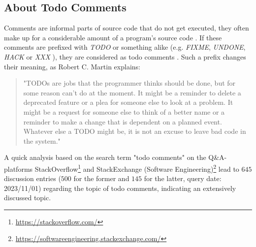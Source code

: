\subsection{About Todo Comments}
\label{sec:introduction-about-todo-comments}
Comments are informal parts of source code that do not get executed, they often make up for a considerable amount of a program's source code \cite{nie_natural_2018}.
If these comments are prefixed with \emph{TODO} or something alike (e.g. \emph{FIXME}, \emph{UNDONE}, \emph{HACK} or \emph{XXX} \cite{storey_how_2009}), they are considered as todo comments \cite{ying_source_2005}.
Such a prefix changes their meaning, as Robert C. Martin explains:
%
\begin{quote}
    "TODOs are jobs that the programmer thinks should be done, but for some reason can't do at the moment. It might be a reminder to delete a deprecated feature or a plea for someone else to look at a problem. It might be a request for someone else to think of a better name or a reminder to make a change that is dependent on a planned event. Whatever else a TODO might be, it is not an excuse to leave bad code in the system." \cite{martin_clean_2009}
\end{quote}
%
A quick analysis based on the search term "todo comments" on the Q\&A-platforms StackOverflow\footnote{\url{https://stackoverflow.com/}} and StackExchange (Software Engineering)\footnote{\url{https://softwareengineering.stackexchange.com/}} lead to $645$ discussion entries ($500$ for the former and $145$ for the latter, query date: 2023/11/01) regarding the topic of todo comments, indicating an extensively discussed topic.

